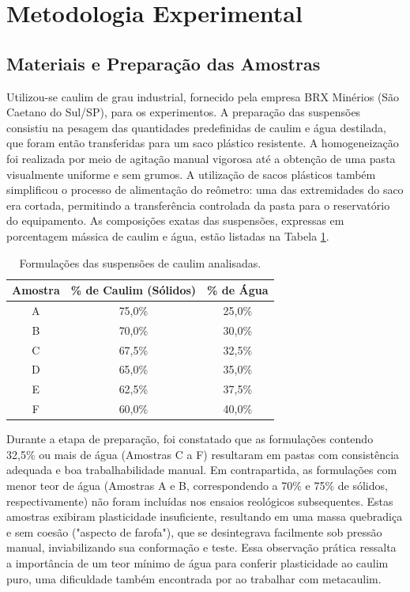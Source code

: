 \documentclass[article,12pt,oneside,a4paper,english,brazil,sumario=tradicional]{abntex2}
\begin{document}
\section{Metodologia Experimental}
\label{sec:metodologia}

\subsection{Materiais e Preparação das Amostras}
Utilizou-se caulim de grau industrial, fornecido pela empresa BRX Minérios (São Caetano do Sul/SP), para os experimentos. A preparação das suspensões consistiu na pesagem das quantidades predefinidas de caulim e água destilada, que foram então transferidas para um saco plástico resistente. A homogeneização foi realizada por meio de agitação manual vigorosa até a obtenção de uma pasta visualmente uniforme e sem grumos. A utilização de sacos plásticos também simplificou o processo de alimentação do reômetro: uma das extremidades do saco era cortada, permitindo a transferência controlada da pasta para o reservatório do equipamento. As composições exatas das suspensões, expressas em porcentagem mássica de caulim e água, estão listadas na Tabela \ref{tab:concentracoes}.

\begin{table}[htbp]
\centering
\caption{Formulações das suspensões de caulim analisadas.}
\label{tab:concentracoes}
\begin{tabular}{@{}ccc@{}}
\toprule
\textbf{Amostra} & \textbf{\% de Caulim (Sólidos)} & \textbf{\% de Água} \\ \midrule
A & 75,0\% & 25,0\% \\
B & 70,0\% & 30,0\% \\
C & 67,5\% & 32,5\% \\
D & 65,0\% & 35,0\% \\
E & 62,5\% & 37,5\% \\
F & 60,0\% & 40,0\% \\ \bottomrule
\end{tabular}
\end{table}

Durante a etapa de preparação, foi constatado que as formulações contendo 32,5\% ou mais de água (Amostras C a F) resultaram em pastas com consistência adequada e boa trabalhabilidade manual. Em contrapartida, as formulações com menor teor de água (Amostras A e B, correspondendo a 70\% e 75\% de sólidos, respectivamente) não foram incluídas nos ensaios reológicos subsequentes. Estas amostras exibiram plasticidade insuficiente, resultando em uma massa quebradiça e sem coesão ("aspecto de farofa"), que se desintegrava facilmente sob pressão manual, inviabilizando sua conformação e teste. Essa observação prática ressalta a importância de um teor mínimo de água para conferir plasticidade ao caulim puro, uma dificuldade também encontrada por  ao trabalhar com metacaulim.
\end{document}
